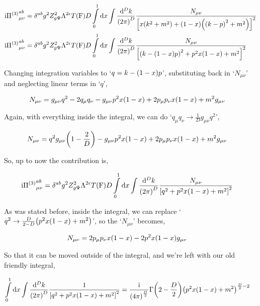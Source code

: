 \begin{align}
    \textnormal{i} {\Pi^{\qty(3)}}^{ab}_{\mu\nu}&=\delta^{ab}g^2Z_{g\Psi}^2\Lambda^{2\epsilon}T\qty(\textnormal{F})D\int\limits_0^1\dd{x}\int\frac{\dd[D]{k}}{\qty(2\pi)^D}\frac{N_{\mu\nu}}{\qty[x\qty(k^2+m^2)+\qty(1-x)\qty(\qty(k-p)^2+m^2)]^2}\nonumber\\
    \textnormal{i} {\Pi^{\qty(3)}}^{ab}_{\mu\nu}&=\delta^{ab}g^2Z_{g\Psi}^2\Lambda^{2\epsilon}T\qty(\textnormal{F})D\int\limits_0^1\dd{x}\int\frac{\dd[D]{k}}{\qty(2\pi)^D}\frac{N_{\mu\nu}}{\qty[\qty(k-\qty(1-x)p)^2+p^2x\qty(1-x)+m^2]^2}\nonumber
\end{align}

Changing integration variables to `$q=k-\qty(1-x)p$', substituting back in `$N_{\mu\nu}$' and neglecting linear terms in `$q$',

\begin{align}
    N_{\mu\nu}&=g_{\mu\nu}q^2-2q_\mu q_\nu-g_{\mu\nu}p^2x\qty(1-x)+2p_\mu p_\nu x\qty(1-x)+m^2 g_{\mu\nu}\nonumber
\end{align}

Again, with everything inside the integral, we can do `$q_\mu q_\nu\rightarrow \frac1Dg_{\mu\nu}q^2$',

\begin{align}
    N_{\mu\nu}&=q^2g_{\mu\nu}\qty(1-\frac2D)-g_{\mu\nu}p^2x\qty(1-x)+2p_\mu p_\nu x\qty(1-x)+m^2 g_{\mu\nu}\nonumber
\end{align}

So, up to now the contribution is,

\begin{align}
    \textnormal{i} {\Pi^{\qty(3)}}^{ab}_{\mu\nu}&=\delta^{ab}g^2Z_{g\Psi}^2\Lambda^{2\epsilon}T\qty(\textnormal{F})D\int\limits_0^1\dd{x}\int\frac{\dd[D]{k}}{\qty(2\pi)^D}\frac{N_{\mu\nu}}{\qty[q^2+p^2x\qty(1-x)+m^2]^2}\nonumber
\end{align}

As was stated before, inside the integral, we can replace `$q^2\rightarrow \frac{D}{2-D}\qty(p^2x\qty(1-x)+m^2)$', so the 
`$N_{\mu\nu}$' becomes,

\begin{align}
    N_{\mu\nu}&=2p_\mu p_\nu x\qty(1-x)-2p^2x\qty(1-x)g_{\mu\nu}\nonumber
\end{align}

So that it can be moved outside of the integral, and we're left with our old friendly integral,

\begin{align}
    \int\limits_0^1\dd{x}\int\frac{\dd[D]{k}}{\qty(2\pi)^D}\frac{1}{\qty[q^2+p^2x\qty(1-x)+m^2]^2}&=\frac{\textnormal{i}}{\qty(4\pi)^{\frac D2}}\Gamma\qty(2-\frac D2)\qty(p^2x\qty(1-x) +m^2)^{\frac D2-2}\nonumber
\end{align}

